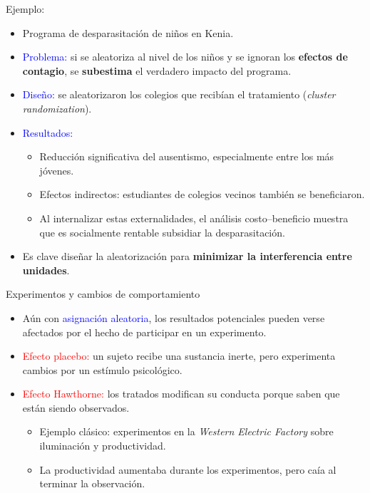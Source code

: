 \documentclass[10pt, xcolor=dvipsnames]{beamer}
\begin{document}
\begin{frame}{Ejemplo: \citet{miguel2004worms}}
\fontvie
\begin{itemize}
    \item Programa de desparasitación de niños en Kenia.
    \smallspace
    \item \textcolor{blue}{Problema:} si se aleatoriza al nivel de los niños y se ignoran los \textbf{efectos de contagio}, se \textbf{subestima} el verdadero impacto del programa.
    \smallspace
    \item \textcolor{blue}{Diseño:} se aleatorizaron los colegios que recibían el tratamiento (\textit{cluster randomization}). %
    \smallspace
    \item \textcolor{blue}{Resultados:}
    \begin{itemize}
        \item Reducción significativa del ausentismo, especialmente entre los más jóvenes.  
        \item Efectos indirectos: estudiantes de colegios vecinos también se beneficiaron.  
        \item Al internalizar estas externalidades, el análisis costo–beneficio muestra que es socialmente rentable subsidiar la desparasitación.  
    \end{itemize}
    \smallspace
    \item Es clave diseñar la aleatorización para \textbf{minimizar la interferencia entre unidades}. 
\end{itemize}
\end{frame}


\begin{frame}{Experimentos y cambios de comportamiento}
\begin{itemize}
    \item Aún con \textcolor{blue}{asignación aleatoria}, los resultados potenciales pueden verse afectados por el hecho de participar en un experimento. \medskip
    \item \textcolor{red}{Efecto placebo:} un sujeto recibe una sustancia inerte, pero experimenta cambios por un estímulo psicológico. \medskip
    \item \textcolor{red}{Efecto Hawthorne:} los tratados modifican su conducta porque saben que están siendo observados. 
    \begin{itemize}
        \item Ejemplo clásico: experimentos en la \textit{Western Electric Factory} sobre iluminación y productividad.  
        \item La productividad aumentaba durante los experimentos, pero caía al terminar la observación. 
    \end{itemize}
\end{itemize}
\end{frame}
\end{document}
